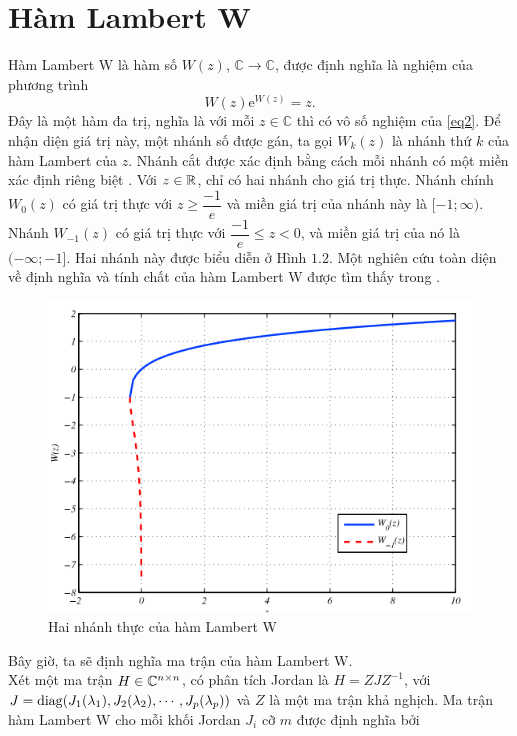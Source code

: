 \section{Hàm Lambert W}
Hàm Lambert W là hàm số $W(z)$, $\mathbb{C} \to \mathbb{C}$, được định nghĩa là nghiệm của phương trình
\begin{equation}\label{eq2}
	W(z) \mathrm{e}^{W(z) }=z.
\end{equation}
Đây là một hàm đa trị, nghĩa là với mỗi $z \in \mathbb{C}$ thì có vô số nghiệm của \eqref{eq2}. Để nhận diện giá trị này, một nhánh số được gán, ta gọi $W_k(z)$ là nhánh thứ $k$ của hàm Lambert của $z$. Nhánh cắt được xác định bằng cách mỗi nhánh có một miền xác định riêng biệt \cite{Cor96}. Với $z \in \mathbb{R}$, chỉ có hai nhánh cho giá trị thực. Nhánh chính $W_0(z)$ có giá trị thực với $z \ge \dfrac{-1}{e}$ và miền giá trị của nhánh này là $[-1;\infty)$. Nhánh $W_{-1}(z)$ có giá trị thực với $\dfrac{-1}{e} \le z < 0$, và miền giá trị của nó là $(-\infty; -1]$. Hai nhánh này được biểu diễn ở Hình $1.2$.
Một nghiên cứu toàn diện về định nghĩa và tính chất của hàm Lambert W được tìm thấy trong \cite{Cor96}.
\begin{figure}[h!]
	\centering
	\includegraphics[scale= 0.7]{"./Hinh/Hinh 1"}
	\caption[Hai nhánh thực của hàm Lambert W]{Hai nhánh thực của hàm Lambert W}
	\label{fig:hinh-1}
\end{figure}
Bây giờ, ta sẽ định nghĩa ma trận của hàm Lambert W. \\
Xét một ma trận $H \in \mathbb{C} ^{n\times n}$, có phân tích Jordan là $H = ZJZ^{-1}$, với $J = \mathrm{diag} (J_1(\lambda_1),J_2(\lambda_2), \cdots , J_p(\lambda_p) )$ và $Z$ là một ma trận khả nghịch. Ma trận hàm Lambert W cho mỗi khối Jordan $J_i$ cỡ $m$ được định nghĩa bởi
